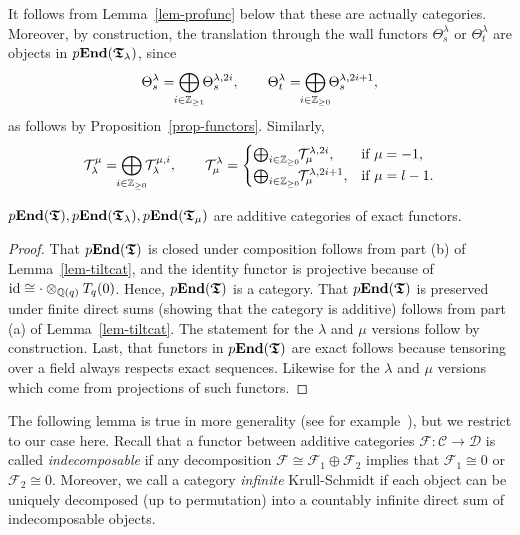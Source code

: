 It follows from Lemma~\ref{lem-profunc} below that these are actually categories. 
Moreover, by construction, the translation through the wall functors 
$\Theta_s^{\lambda}$ or $\Theta_t^{\lambda}$ are objects in $p\boldsymbol{\mathrm{End}}(\boldsymbol{\mathfrak{T}}_{\lambda})$, 
since
\begin{equation}\label{eq-projectivefunc}
\Theta_s^{\lambda}=\!\!\bigoplus_{i\in\bZ_{\geq 1}}\!\!\Theta_s^{\lambda,2i},\quad\quad\Theta_t^{\lambda}=\!\!\bigoplus_{i\in\bZ_{\geq 0}}\!\!\Theta_s^{\lambda,2i+1},
\end{equation}
as follows by Proposition~\ref{prop-functors}. Similarly,
\begin{equation}\label{eq-projectivefunc2}
\mathcal T_{\lambda}^{\mu}=\!\!\bigoplus_{i\in\bZ_{\geq 0}}\!\!\mathcal T_{\lambda}^{\mu,i},\quad\quad \mathcal T_{\mu}^{\lambda}=\begin{cases}\bigoplus_{i\in\bZ_{\geq 0}}\!\!\mathcal T_{\mu}^{\lambda,2i}, &\text{if }\mu=-1,\\
\bigoplus_{i\in\bZ_{\geq 0}}\!\!\mathcal T_{\mu}^{\lambda,2i+1}, &\text{if }\mu=l-1.\end{cases}
\end{equation}

\newpage

\begin{lem}\label{lem-profunc}
$p\boldsymbol{\mathrm{End}}(\boldsymbol{\mathfrak{T}}), p\boldsymbol{\mathrm{End}}(\boldsymbol{\mathfrak{T}}_{\lambda}), p\boldsymbol{\mathrm{End}}(\boldsymbol{\mathfrak{T}}_{\mu})$ are additive 
categories of exact functors.\makeqed
\end{lem}



\begin{proof}
That $p\boldsymbol{\mathrm{End}}(\boldsymbol{\mathfrak{T}})$ is closed under composition 
follows from part (b) of Lemma~\ref{lem-tiltcat}, 
and the identity functor is projective because 
of $\mathrm{id}\cong\cdot\otimes_{\mathbb{Q}(q)} T_q({0})$. Hence, $p\boldsymbol{\mathrm{End}}(\boldsymbol{\mathfrak{T}})$ is a category.
That $p\boldsymbol{\mathrm{End}}(\boldsymbol{\mathfrak{T}})$ is preserved under finite 
direct sums (showing that the category is 
additive) follows from part (a) of Lemma~\ref{lem-tiltcat}. 
The statement for the $\lambda$ and $\mu$ 
versions follow by construction.
Last, that functors in 
$p\boldsymbol{\mathrm{End}}(\boldsymbol{\mathfrak{T}})$ are exact follows because tensoring over a 
field always respects exact sequences. 
Likewise for the $\lambda$ and $\mu$ versions which come 
from projections of such functors.
\end{proof}



The following lemma 
is true in more generality (see for example~\cite[Chapter~4, Section~6]{ass}), 
but we restrict to our case here. Recall that a 
functor between additive categories 
$\mathcal F\colon\mathcal C\to\mathcal D$ is 
called \textit{indecomposable} if any 
decomposition $\mathcal F\cong\mathcal F_1\oplus\mathcal F_2$ 
implies that $\mathcal F_1\cong 0$ or $\mathcal F_2\cong 0$.
Moreover, we call a category \textit{infinite} Krull-Schmidt 
if each object can be uniquely decomposed (up to permutation) 
into a countably infinite direct sum of indecomposable objects.



